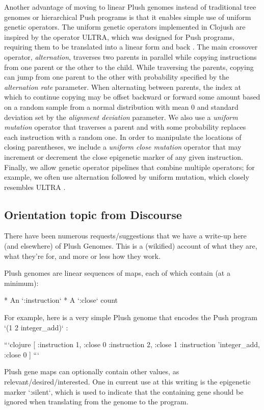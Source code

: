 Another advantage of moving to linear Plush genomes instead of traditional tree genomes or hierarchical Push programs is that it enables simple use of uniform genetic operators. The uniform genetic operators implemented in Clojush are inspired by the operator ULTRA, which was designed for Push programs, requiring them to be translated into a linear form and back \cite{Spector:2013:GPTP}. The main crossover operator, \textit{alternation}, traverses two parents in parallel while copying instructions from one parent or the other to the child. While traversing the parents, copying can jump from one parent to the other with probability specified by the \textit{alternation rate} parameter. When alternating between parents, the index at which to continue copying may be offset backward or forward some amount based on a random sample from a normal distribution with mean 0 and standard deviation set by the \textit{alignment deviation} parameter. We also use a \textit{uniform mutation} operator that traverses a parent and with some probability replaces each instruction with a random one. In order to manipulate the locations of closing parentheses, we include a \textit{uniform close mutation} operator that may increment or decrement the close epigenetic marker of any given instruction. Finally, we allow genetic operator pipelines that combine multiple operators; for example, we often use alternation followed by uniform mutation, which closely resembles ULTRA \cite{Spector:2013:GPTP}.


\subsection{Orientation topic from Discourse}

There have been numerous requests/suggestions that we have a write-up here (and elsewhere) of Plush Genomes. This is a (wikified) account of what they are, what they're for, and more or less how they work.

Plush genomes are linear sequences of maps, each of which contain (at a minimum):

* An `:instruction`
* A `:close` count

For example, here is a very simple Plush genome that encodes the Push program `(1 2 integer\_add)` :

```clojure
[ {:instruction 1, :close 0}
  {:instruction 2, :close 1}
  {:instruction 'integer\_add, :close 0} ]
```

Plush gene maps can optionally contain other values, as relevant/desired/interested. One in current use at this writing is the epigenetic marker `:silent`, which is used to indicate that the containing gene should be ignored when translating from the genome to the program.

